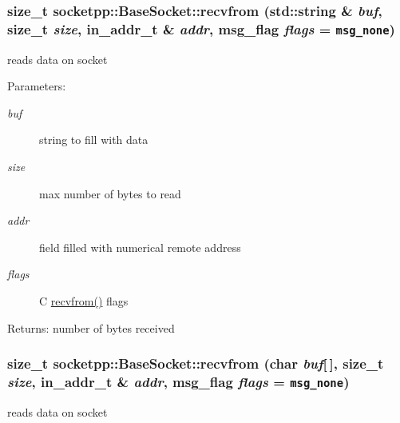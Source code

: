 \begin{CompactItemize}
{\subsubsection[{recvfrom}]{\setlength{\rightskip}{0pt plus 5cm}size\_\-t socketpp::BaseSocket::recvfrom (std::string \& {\em buf}, \/  size\_\-t {\em size}, \/  in\_\-addr\_\-t \& {\em addr}, \/  msg\_\-flag {\em flags} = {\tt msg\_\-none})}}
\label{classsocketpp_1_1BaseSocket_723f0c1b9325ef3be7c97f520e6bc775}


reads data on socket 

\begin{Desc}
\item[Parameters:]
\begin{description}
\item[{\em buf}]string to fill with data \item[{\em size}]max number of bytes to read \item[{\em addr}]field filled with numerical remote address \item[{\em flags}]C \hyperlink{classsocketpp_1_1BaseSocket_6a207860c0a1328dc05bea32bb62e81f}{recvfrom()} flags \end{description}
\end{Desc}
\begin{Desc}
\item[Returns:]number of bytes received \end{Desc}
\hypertarget{classsocketpp_1_1BaseSocket_0d4fad99bfe9601866a974f57c9f0370}{
\subsubsection[{recvfrom}]{\setlength{\rightskip}{0pt plus 5cm}size\_\-t socketpp::BaseSocket::recvfrom (char {\em buf}\mbox{[}$\,$\mbox{]}, \/  size\_\-t {\em size}, \/  in\_\-addr\_\-t \& {\em addr}, \/  msg\_\-flag {\em flags} = {\tt msg\_\-none})}}
\label{classsocketpp_1_1BaseSocket_0d4fad99bfe9601866a974f57c9f0370}


reads data on socket 


\end{CompactItemize}
